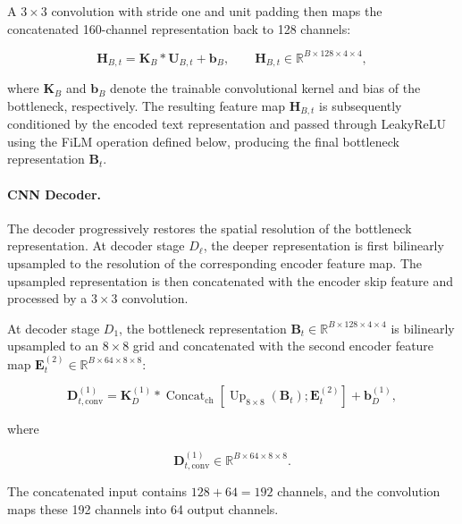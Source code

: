 A $3\times3$ convolution with stride one and unit padding then maps the
concatenated 160-channel representation back to 128 channels:

\begin{equation}\label{eq:ch3:bottleneck_convolution}
\mathbf{H}_{B,t}
=
\mathbf{K}_{B}
\ast
\mathbf{U}_{B,t}
+
\mathbf{b}_{B},
\qquad
\mathbf{H}_{B,t}
\in
\mathbb{R}^{B\times128\times4\times4},
\end{equation}

where $\mathbf{K}_{B}$ and $\mathbf{b}_{B}$ denote the trainable convolutional
kernel and bias of the bottleneck, respectively. The resulting feature map
$\mathbf{H}_{B,t}$ is subsequently conditioned by the encoded text
representation and passed through LeakyReLU using the FiLM operation defined
below, producing the final bottleneck representation $\mathbf{B}_t$.


\paragraph*{CNN Decoder.}
The decoder progressively restores the spatial resolution of the bottleneck
representation. At decoder stage $D_{\ell}$, the deeper representation is
first bilinearly upsampled to the resolution of the corresponding encoder
feature map. The upsampled representation is then concatenated with the
encoder skip feature and processed by a $3\times3$ convolution.

At decoder stage $D_1$, the bottleneck representation
$\mathbf{B}_t\in\mathbb{R}^{B\times128\times4\times4}$ is bilinearly
upsampled to an $8\times8$ grid and concatenated with the second encoder
feature map
$\mathbf{E}^{(2)}_t\in\mathbb{R}^{B\times64\times8\times8}$:

\begin{equation}\label{eq:ch3:decoder1_convolution}
\mathbf{D}^{(1)}_{t,\mathrm{conv}}
=
\mathbf{K}^{(1)}_D
\ast
\operatorname{Concat}_{\mathrm{ch}}
\left[
\operatorname{Up}_{8\times8}(\mathbf{B}_t);
\mathbf{E}^{(2)}_t
\right]
+
\mathbf{b}^{(1)}_D,
\end{equation}

where

\begin{equation}
\mathbf{D}^{(1)}_{t,\mathrm{conv}}
\in
\mathbb{R}^{B\times64\times8\times8}.
\end{equation}

The concatenated input contains $128+64=192$ channels, and the convolution
maps these 192 channels into 64 output channels.


